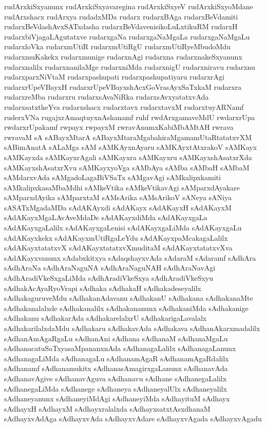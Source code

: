{rudArxkiSxyanunx
rudArxkiSxyavaregina
rudArxkiSxyeV
rudArxkiSxyoMdane
rudArxshacx
rudArxya
rudadxMDa
rudarx
rudarxBAga
rudarxBeVdamiti
rudarxBeVdashAvxSATxdasha
rudarxBeVdavenisikoLuLxtikuRM
rudarxH
rudarxbiVjagaLAgutatxve
rudarxgaNa
rudarxgaNaMgaLa
rudarxgaNaMgaLu
rudarxloVka
rudarxmUtiR
rudarxmUtiRgU
rudarxmUtiRyeMbudoMdu
rudarxmuKakekx
rudarxmunige
rudarxnAgi
rudarxna
rudarxnakeSxyanunx
rudarxnalilx
rudarxnanilaMge
rudarxniMda
rudarxnigU
rudarxniravu
rudarxnu
rudarxparxNiVtaM
rudarxpashupati
rudarxpashupatiyaru
rudarxrAgi
rudarxrUpeVBayxH
rudarxrUpeVBayxshAcxGoVrasAyxSaTxkaM
rudarxra
rudarxreMba
rudarxru
rudarxsAvaNiRka
rudarxsAvxyatatxvAda
rudarxsatxtheYva
rudarxshacx
rudarxtavx
rudarxtavxM
rudarxtuyARNamf
ruderxVNa
rugajxrAmaqtuyxnAshanamf
ruhf
rwdArxgamaveMdU
rwdarxrUpa
rwdarxrUpakamf
rwpayx
rwpayxM
rwravAnumxKabiMbAMtAH
rwrava
rwravaM
sA
sABayxMtarA
sABayxMtaraMgabahiraMgamamUtaRtatatxvXM
sABimAnatA
sALaMga
sAM
sAMKAyxnAyaru
sAMKAyxtAtxrakoV
sAMKayx
sAMKayxda
sAMKayxrAgali
sAMKayxra
sAMKayxru
sAMKayxshAsatxrXda
sAMKayxshAsatxrXvu
sAMKayxyoVga
sAMbAya
sAMba
sAMbaH
sAMbaM
sAMdarxvAda
sAMgadoLagaBiVSaTx
sAMgavAgi
sAMkalipxkamiti
sAMkalipxkasaMbaMdhi
sAMkeVtika
sAMkeVtikavAgi
sAMparxdAyakare
sAMparxdAyika
sAMparxtaM
sAMsArika
sAMsArikoV
sANeya
sANiya
sASATxMgadaMDa
sAdAKAyxdi
sAdAKayx
sAdAKayxH
sAdAKayxM
sAdAKayxMgaLAvAveMdaDe
sAdAKayxdiMda
sAdAKayxgaLa
sAdAKayxgaLalilx
sAdAKayxgaLenisi
sAdAKayxgaLiMda
sAdAKayxgaLu
sAdAKayxkekx
sAdAKayxmUtiRgaLeYdu
sAdAKayxpaMcakagaLalilx
sAdAKayxtatatxvX
sAdAKayxtatatxvXmuditaM
sAdAKayxtatatxvXva
sAdAKayxvanunx
sAdabxkitxya
sAdaqshayxvAda
sAdaraM
sAdaramf
sAdhAra
sAdhAraNa
sAdhAraNaguNA
sAdhAraNaguNAH
sAdhAraNavAgi
sAdhAradiVkeSxgaLiMda
sAdhAradiVkeSxya
sAdhAradiVkeSxyu
sAdhakAcAyaRyoVrapi
sAdhaka
sAdhakaH
sAdhakadeseyalilx
sAdhakaguruveMdu
sAdhakanAdavanu
sAdhakanU
sAdhakana
sAdhakanaMte
sAdhakanalalxde
sAdhakanalilx
sAdhakananunx
sAdhakaniMda
sAdhakanige
sAdhakanu
sAdhakarAda
sAdhakarelalxrU
sAdhakarigaLavalalx
sAdhakarilalxdaMdu
sAdhakaru
sAdhakavAda
sAdhakava
sAdhanAkarxmadalilx
sAdhanAmAgaRgaLu
sAdhanAni
sAdhana
sAdhanaM
sAdhanaMgaLu
sAdhanacatuSaTxyasaMpananxnAda
sAdhanagaLalilx
sAdhanagaLanunx
sAdhanagaLiMda
sAdhanagaLu
sAdhanamAgaR
sAdhanamAgaRdalilx
sAdhanamf
sAdhanamukitx
sAdhanasAmagirxgaLanunx
sAdhanavAda
sAdhanavAgive
sAdhanavAguva
sAdhanavu
sAdhane
sAdhanegaLalilx
sAdhanegaLiMda
sAdhanege
sAdhaneya
sAdhaneyalUlx
sAdhaneyalilx
sAdhaneyanunx
sAdhaneyiMdAgi
sAdhaneyiMda
sAdhayituM
sAdhayx
sAdhayxH
sAdhayxM
sAdhayxralalxda
sAdhayxsatxtAsxdhanaM
sAdhayxvAdAga
sAdhayxvAda
sAdhayxvAdare
sAdhayxvAgada
sAdhayxvAgadu
}
